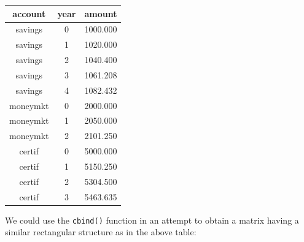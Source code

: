 \documentclass[
]{book}
\begin{document}
\begin{longtable}[]{@{}ccc@{}}
\toprule()
account & year & amount \\
\midrule()
\endhead
savings & 0 & 1000.000 \\
savings & 1 & 1020.000 \\
savings & 2 & 1040.400 \\
savings & 3 & 1061.208 \\
savings & 4 & 1082.432 \\
moneymkt & 0 & 2000.000 \\
moneymkt & 1 & 2050.000 \\
moneymkt & 2 & 2101.250 \\
certif & 0 & 5000.000 \\
certif & 1 & 5150.250 \\
certif & 2 & 5304.500 \\
certif & 3 & 5463.635 \\
\bottomrule()
\end{longtable}

We could use the \texttt{cbind()} function in an attempt to obtain a matrix having
a similar rectangular structure as in the above table:
\end{document}

